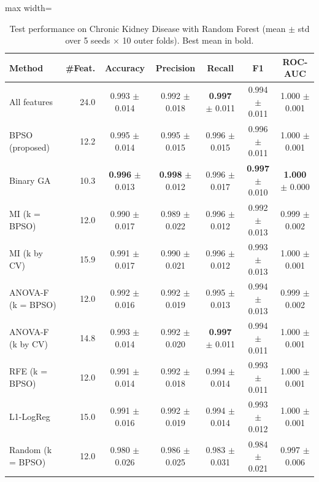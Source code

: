 \begin{table}[!t]
\centering
\caption{Test performance on Chronic Kidney Disease with Random Forest (mean $\pm$ std over 5 seeds $\times$ 10 outer folds). Best mean in bold.}
\label{tab:results_ckd}
\footnotesize
\setlength{\tabcolsep}{4pt}
\begin{adjustbox}{max width=\linewidth}
\begin{tabular}{lrccccc}
\toprule
\textbf{Method} & \textbf{\#Feat.} & \textbf{Accuracy} & \textbf{Precision} & \textbf{Recall} & \textbf{F1} & \textbf{ROC-AUC} \\
\midrule
All features & 24.0 & 0.993 $\pm$ 0.014 & 0.992 $\pm$ 0.018 & \textbf{0.997} $\pm$ 0.011 & 0.994 $\pm$ 0.011 & 1.000 $\pm$ 0.001 \\
BPSO (proposed) & 12.2 & 0.995 $\pm$ 0.014 & 0.995 $\pm$ 0.015 & 0.996 $\pm$ 0.015 & 0.996 $\pm$ 0.011 & 1.000 $\pm$ 0.001 \\
Binary GA & 10.3 & \textbf{0.996} $\pm$ 0.013 & \textbf{0.998} $\pm$ 0.012 & 0.996 $\pm$ 0.017 & \textbf{0.997} $\pm$ 0.010 & \textbf{1.000} $\pm$ 0.000 \\
MI (k = BPSO) & 12.0 & 0.990 $\pm$ 0.017 & 0.989 $\pm$ 0.022 & 0.996 $\pm$ 0.012 & 0.992 $\pm$ 0.013 & 0.999 $\pm$ 0.002 \\
MI (k by CV) & 15.9 & 0.991 $\pm$ 0.017 & 0.990 $\pm$ 0.021 & 0.996 $\pm$ 0.012 & 0.993 $\pm$ 0.013 & 1.000 $\pm$ 0.001 \\
ANOVA-F (k = BPSO) & 12.0 & 0.992 $\pm$ 0.016 & 0.992 $\pm$ 0.019 & 0.995 $\pm$ 0.013 & 0.994 $\pm$ 0.013 & 0.999 $\pm$ 0.002 \\
ANOVA-F (k by CV) & 14.8 & 0.993 $\pm$ 0.014 & 0.992 $\pm$ 0.020 & \textbf{0.997} $\pm$ 0.011 & 0.994 $\pm$ 0.011 & 1.000 $\pm$ 0.001 \\
RFE (k = BPSO) & 12.0 & 0.991 $\pm$ 0.014 & 0.992 $\pm$ 0.018 & 0.994 $\pm$ 0.014 & 0.993 $\pm$ 0.011 & 1.000 $\pm$ 0.001 \\
L1-LogReg & 15.0 & 0.991 $\pm$ 0.016 & 0.992 $\pm$ 0.019 & 0.994 $\pm$ 0.014 & 0.993 $\pm$ 0.012 & 1.000 $\pm$ 0.001 \\
Random (k = BPSO) & 12.0 & 0.980 $\pm$ 0.026 & 0.986 $\pm$ 0.025 & 0.983 $\pm$ 0.031 & 0.984 $\pm$ 0.021 & 0.997 $\pm$ 0.006 \\
\bottomrule
\end{tabular}
\end{adjustbox}
\end{table}

